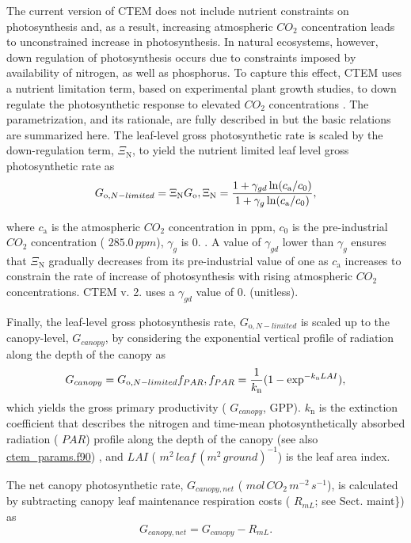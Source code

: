 The current version of C\+T\+E\+M does not include nutrient constraints on photosynthesis and, as a result, increasing atmospheric $CO_2$ concentration leads to unconstrained increase in photosynthesis. In natural ecosystems, however, down regulation of photosynthesis occurs due to constraints imposed by availability of nitrogen, as well as phosphorus. To capture this effect, C\+T\+E\+M uses a nutrient limitation term, based on experimental plant growth studies, to down regulate the photosynthetic response to elevated $CO_2$ concentrations \cite{Arora2009-9bc}. The parametrization, and its rationale, are fully described in \cite{Arora2009-9bc} but the basic relations are summarized here. The leaf-\/level gross photosynthetic rate is scaled by the down-\/regulation term, $\Xi_\mathrm{N}$, to yield the nutrient limited leaf level gross photosynthetic rate as \[ \label{G_nitro} G_{\mathrm{o},N-limited} = \Xi_\mathrm{N} G_\mathrm{o}, \\ \label{Nthrottle} \Xi_\mathrm{N} = \frac{1 + \gamma_{gd} \ln(c_\mathrm{a}/c_{0})}{1 + \gamma_g \ln(c_\mathrm{a}/c_{0})}, \]

where $c_\mathrm{a}$ is the atmospheric $CO_2$ concentration in ppm, $c_{0}$ is the pre-\/industrial $CO_2$ concentration ( $285.0\,ppm$), $\gamma_g$ is 0. \cite{Arora2009-9bc}. A value of $\gamma_{gd}$ lower than $\gamma_g$ ensures that $\Xi_\mathrm{N}$ gradually decreases from its pre-\/industrial value of one as $c_\mathrm{a}$ increases to constrain the rate of increase of photosynthesis with rising atmospheric $CO_2$ concentrations. C\+T\+E\+M v. 2. uses a $\gamma_{gd}$ value of 0. (unitless).

Finally, the leaf-\/level gross photosynthesis rate, $G_{\mathrm{o},N-limited}$ is scaled up to the canopy-\/level, $G_{canopy}$, by considering the exponential vertical profile of radiation along the depth of the canopy as \[ \label{G_canopy} G_{canopy} = G_{\mathrm{o},N-limited} f_{PAR},\\ \label{fpar} f_{PAR} = \frac{1}{k_\mathrm{n}}(1-\exp^{-k_\mathrm{n}LAI}), \] which yields the gross primary productivity ( $G_{canopy}$, G\+P\+P). $k_\mathrm{n}$ is the extinction coefficient that describes the nitrogen and time-\/mean photosynthetically absorbed radiation ( $PAR$) profile along the depth of the canopy (see also \hyperlink{ctem__params_8f90}{ctem\+\_\+params.\+f90}) \cite{Ingestad1986-td} \cite{Field1986-kd}, and $LAI$ ( $m^{2}\,leaf\,(m^{2}\,ground)^{-1}$) is the leaf area index.

The net canopy photosynthetic rate, $G_{canopy,net}$ ( $mol\,CO_2\,m^{-2}\,s^{-1}$), is calculated by subtracting canopy leaf maintenance respiration costs ( $R_{mL}$; see Sect. maint\}) as \[ \label{Gnet} G_{canopy,net} = G_{canopy} - R_{mL}. \]

